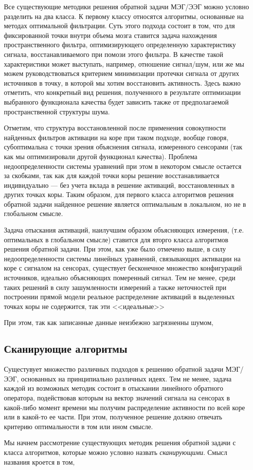 Все существующие методики решения обратной задачи МЭГ/ЭЭГ можно условно разделить на два класса.
К первому классу относятся алгоритмы, основанные на методах оптимальной фильтрации.
Суть этого подхода состоит в том, что для фиксированной точки внутри объема мозга ставится задача нахождения
пространственного фильтра, оптимизирующего определенную характеристику сигнала,
восстанавливаемого при помози этого фильтра.
В качестве такой характеристики может выступать, например, отношение сигнал/шум,
или же мы можем руководствоваться критерием минимизации протечки сигнала от других источников в точку,
в которой мы хотим восстановить активность.
Здесь важно отметить, что конкретный вид решения, полученного в результате оптимизации выбранного
функционала качества будет зависить также от предполагаемой пространственной структуры шума.

Отметим, что структура восстановленной после применения совокупности найденных фильтров
активации на коре при таком подходе, вообще говоря, субоптимальна с точки зрения объяснения сигнала,
измеренного сенсорами (так как мы оптимизировали другой функционал качества).
Проблема недоопределенности системы уравнений при этом в некотором смысле остается за скобками,
так как для каждой точки коры решение восстанавливается индивидуально ---
без учета вклада в решение активаций, восстановленных в других точках коры.
Таким образом, для первого класса алгоритмов решения обратной задачи найденное решение
является оптимальным в локальном, но не в глобальном смысле.

Задача отыскания активаций, наилучшим образом объясняющих измерения, (т.е. оптимальных в глобальном смысле)
ставится для вторго класса алгоритмов решения обратной задачи.
При этом, как уже было отмечено выше, в силу недоопределенности системы линейных уравнений,
связывающих активации на коре с сигналом на сенсорах, существует бесконечное множество
конфигураций источников, идеально объясняющих померенный сигнал.
Тем не менее, среди таких решений в силу зашумленности измерений а также неточностей
при построении прямой модели реальное распределение активаций в выделенных точках коры
не содержится, так эти <<идеальные>> 

При этом, так как записанные данные неизбежно загрязненны шумом, 





\subsection{Сканирующие алгоритмы} \label{sect_dics}
Сущестувует множество различных подходов к решению обратной задачи МЭГ/ЭЭГ, основанных
на принципиально различных идеях.
Тем не менее, задача каждой из возможных методик состоит в отыскании
линейного обратного оператора, подействовав которым на вектор значений сигнала на сенсорах
в какой-либо момент времени мы получим распределение активности по всей коре или в какой-то ее части.
При этом, полученное решение должно отвечать критерию оптимальности в том или ином смысле.

Мы начнем рассмотрение существующих методик решения обратной задачи с класса алгоритмов, которые
можно условно назвать \emph{сканирующими}. Смысл названия кроется в том,
